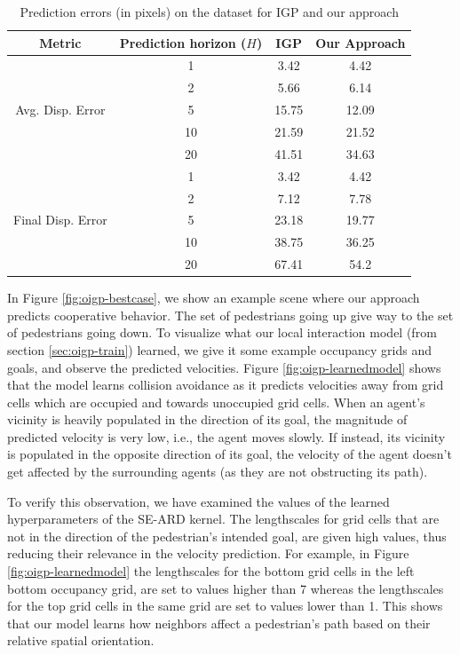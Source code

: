 \begin{table}[t!]
  \caption{Prediction errors (in pixels) on the dataset for IGP and our approach}
  \centering
  \begin{tabular}{|c|c|c|c|}
    \hline
    Metric & Prediction horizon ($H$) & IGP & Our Approach \\
    \hline
    \multirow{5}{*}{Avg. Disp. Error} & 1 & 3.42 & 4.42 \\
    & 2 & 5.66 & 6.14 \\
    & 5 & 15.75 & 12.09 \\
    & 10 & 21.59 & 21.52 \\
    & 20 & 41.51 & 34.63 \\
    \hline
    \multirow{5}{*}{Final Disp. Error} & 1 & 3.42 & 4.42 \\
    & 2 & 7.12 & 7.78 \\
    & 5 & 23.18 & 19.77 \\
    & 10 & 38.75 & 36.25 \\
    & 20 & 67.41 & 54.2 \\
    \hline
  \end{tabular}
  \label{table:oigp-results}
\end{table}

In Figure \ref{fig:oigp-bestcase}, we show an example scene where our approach predicts cooperative behavior. The set of pedestrians going up give way to the set of pedestrians going down. To visualize what our local interaction model (from section \ref{sec:oigp-train}) learned, we give it some example occupancy grids and goals, and observe the predicted velocities. Figure \ref{fig:oigp-learnedmodel} shows that the model learns collision avoidance as it predicts velocities away from grid cells which are occupied and towards unoccupied grid cells. When an agent's vicinity is heavily populated in the direction of its goal, the magnitude of predicted velocity is very low, i.e., the agent moves slowly. If instead, its vicinity is populated in the opposite direction of its goal, the velocity of the agent doesn't get affected by the surrounding agents (as they are not obstructing its path).

To verify this observation, we have examined the values of the learned hyperparameters of the SE-ARD kernel. The lengthscales for grid cells that are not in the direction of the pedestrian's intended goal, are given high values, thus reducing their relevance in the velocity prediction. For example, in Figure \ref{fig:oigp-learnedmodel} the lengthscales for the bottom grid cells in the left bottom occupancy grid, are set to values higher than 7 whereas the lengthscales for the top grid cells in the same grid are set to values lower than 1. This shows that our model learns how neighbors affect a pedestrian's path based on their relative spatial orientation. 

